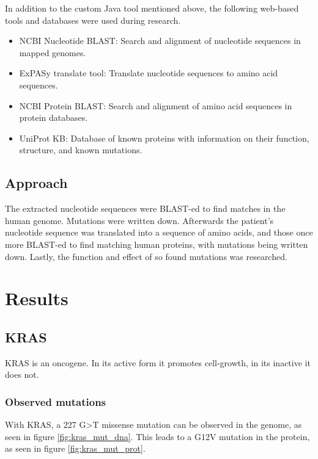 \documentclass[a4paper,english]{scrreprt}
\begin{document}
In addition to the custom Java tool mentioned above, the following web-based
tools and databases were used during research.

\begin{itemize}
	\item NCBI Nucleotide BLAST\cite{website:blastn}: Search and alignment of nucleotide sequences in mapped genomes.
	\item ExPASy translate tool\cite{website:expasy}: Translate nucleotide sequences to amino acid sequences.
	\item NCBI Protein BLAST\cite{website:blastp}: Search and alignment of amino acid sequences in protein databases.
	\item UniProt KB\cite{website:uniprot}: Database of known proteins with information on their function, structure, and known mutations.
\end{itemize}

\section{Approach}

The extracted nucleotide sequences were BLAST-ed to find matches in the human
genome. Mutations were written down. Afterwards the patient's nucleotide
sequence was translated into a sequence of amino acids, and those once more
BLAST-ed to find matching human proteins, with mutations being written down.
Lastly, the function and effect of so found mutations was researched.

\chapter{Results}

\section{KRAS}

KRAS is an oncogene. In its active form it promotes cell-growth, in its
inactive it does not.

\subsection{Observed mutations}

With KRAS, a 227 G>T missense mutation can be observed in the genome, as seen
in figure \ref{fig:kras_mut_dna}. This leads to a G12V mutation in the protein,
as seen in figure \ref{fig:kras_mut_prot}.
\end{document}
